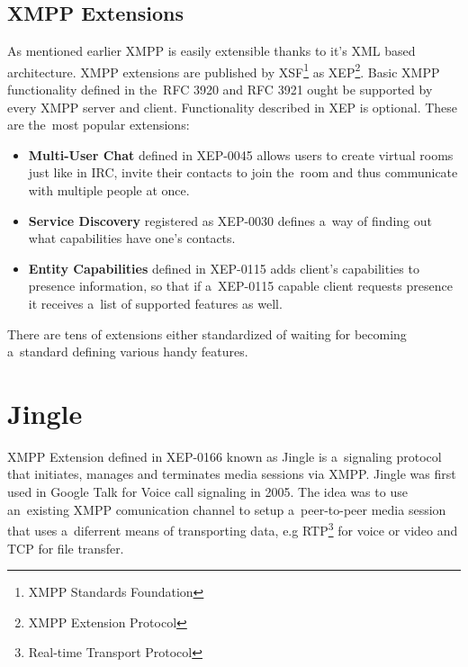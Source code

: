 \subsection*{XMPP Extensions}
As mentioned earlier XMPP is easily extensible thanks to it's XML based architecture. XMPP extensions are published by XSF\footnote{XMPP Standards Foundation} as XEP\footnote{XMPP Extension Protocol}. Basic XMPP functionality defined in the~RFC 3920 and RFC 3921 ought be supported by every XMPP server and client. Functionality described in XEP is optional. These are the~most popular extensions:
\begin{itemize}
	\item{\bf Multi-User Chat} defined in XEP-0045 \cite{xepMUC} allows users to create virtual rooms just like in IRC, invite their contacts to join the~room and thus communicate with multiple people at once.
	\item{\bf Service Discovery} registered as XEP-0030 \cite{xepServiceDiscovery} defines a~way of finding out what capabilities have one's contacts.
	\item{\bf Entity Capabilities} defined in XEP-0115 \cite{xepCapabilitiesAdvertisement} adds client's capabilities to presence information, so that if a~XEP-0115 capable client requests presence it receives a~list of supported features as well.
\end{itemize}

There are tens of extensions either standardized of waiting for becoming a~standard defining various handy features.

\section{Jingle}
XMPP Extension defined in XEP-0166 \cite{xepJignle} known as Jingle is a~signaling protocol that initiates, manages and terminates media sessions via XMPP. Jingle was first used in Google Talk \cite{googleTalk} for Voice call signaling in 2005. The idea was to use an~existing XMPP comunication channel to setup a~peer-to-peer media session that uses a~diferrent means of transporting data, e.g RTP\footnote{Real-time Transport Protocol} for voice or video and TCP for file transfer. 

